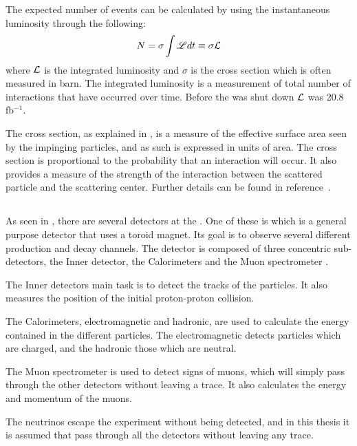 The expected number of events can be calculated by using the instantaneous luminosity through the following:
\begin{equation}\label{eq:Numevents}
N=\sigma \int \mathscr{L} dt \equiv \sigma \mathcal{L}
\end{equation}
where $\mathcal{L}$ is the integrated luminosity and $\sigma$ is the cross section which is often measured in barn.
The integrated luminosity is a measurement of total number of interactions that have occurred over time. Before the \abbrLHC was shut down $\mathcal{L}$ was 20.8 fb$^{-1}$.

The cross section, as explained in , is a measure of the effective surface area seen by the impinging particles, and as such is expressed in units of area. The cross section is proportional to the probability that an interaction will occur. It also provides a measure of the strength of the interaction between the scattered particle and the scattering center.
Further details can be found in reference~\citep{Herr:2006}.

\subsection{\abbrATLAS}
As seen in , there are several detectors at the \abbrLHC. One of these is \abbrATLAS which is a general purpose detector that uses a toroid magnet. Its goal is to observe several different production and decay channels. The detector is composed of three concentric sub-detectors, the Inner detector, the Calorimeters and the Muon spectrometer \citep{1129811}.

The Inner detectors main task is to detect the tracks of the particles. It also measures the position of the initial proton-proton collision.

The Calorimeters, electromagnetic and hadronic, are used to calculate the energy contained in the different particles. The electromagnetic detects particles which are charged, and the hadronic those which are neutral.

The Muon spectrometer is used to detect signs of muons, which will simply pass through the other detectors without leaving a trace. It also calculates the energy and momentum of the muons.

The neutrinos escape the \abbrATLAS experiment without being detected, and in this thesis it is assumed that \abbrWIMPS pass through all the detectors without leaving any trace.

